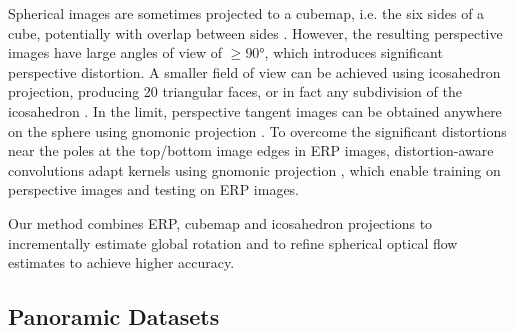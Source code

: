 Spherical images are sometimes projected to a cubemap,
i.e. the six sides of a cube, potentially with overlap between sides \cite{ChengCDWLS2018, WangHCLYSCS2018, WangYSCT2020}.
However, the resulting perspective images have large angles of view of $\geq$90°, which introduces significant perspective distortion.
%
A smaller field of view can be achieved using icosahedron projection, producing 20 triangular faces, or in fact any subdivision of the icosahedron \citep{LuoZSX2019, ZhangLSC2019, LeeJYJY2019}.
In the limit, perspective tangent images can be obtained anywhere on the sphere using gnomonic projection \citep{CoorsCG2018, EderSLF2020}.
%
To overcome the significant distortions near the poles at the top/bottom image edges in ERP images, distortion-aware convolutions adapt kernels using gnomonic projection \cite{TatenNT2018, CoorsCG2018, SuG2019}, which enable training on perspective images and testing on ERP images.


Our method combines ERP, cubemap and icosahedron projections to incrementally estimate global rotation and to refine spherical optical flow estimates to achieve higher accuracy.






\subsection{Panoramic Datasets}

